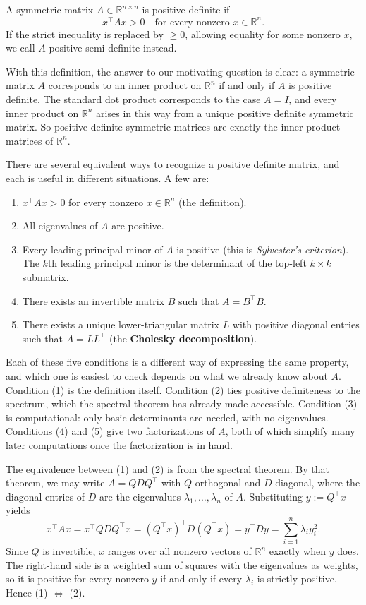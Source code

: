 \documentclass{article}
\begin{document}
\noindent A symmetric matrix $A \in \mathbb{R}^{n \times n}$ is positive definite if
$$x^\top A x > 0 \quad \text{for every nonzero } x \in \mathbb{R}^n.$$
If the strict inequality is replaced by $\geq 0$, allowing equality for some nonzero $x$, we call $A$ positive semi-definite instead.
 
With this definition, the answer to our motivating question is clear: a symmetric matrix $A$ corresponds to an inner product on $\mathbb{R}^n$ if and only if $A$ is positive definite. The standard dot product corresponds to the case $A = I$, and every inner product on $\mathbb{R}^n$ arises in this way from a unique positive definite symmetric matrix. So positive definite symmetric matrices are exactly the inner-product matrices of $\mathbb{R}^n$.
 
There are several equivalent ways to recognize a positive definite matrix, and each is useful in different situations. A few are:
\begin{enumerate}
    \item $x^\top A x > 0$ for every nonzero $x \in \mathbb{R}^n$ (the definition).
    \item All eigenvalues of $A$ are positive.
    \item Every leading principal minor of $A$ is positive (this is \textit{Sylvester's criterion}). The $k$th leading principal minor is the determinant of the top-left $k \times k$ submatrix.
    \item There exists an invertible matrix $B$ such that $A = B^\top B$.
    \item There exists a unique lower-triangular matrix $L$ with positive diagonal entries such that $A = L L^\top$ (the \textbf{Cholesky decomposition}).
\end{enumerate}
 
Each of these five conditions is a different way of expressing the same property, and which one is easiest to check depends on what we already know about $A$. Condition (1) is the definition itself. Condition (2) ties positive definiteness to the spectrum, which the spectral theorem has already made accessible. Condition (3) is computational: only basic determinants are needed, with no eigenvalues. Conditions (4) and (5) give two factorizations of $A$, both of which simplify many later computations once the factorization is in hand.
 
The equivalence between (1) and (2) is from the spectral theorem. By that theorem, we may write $A = QDQ^\top$ with $Q$ orthogonal and $D$ diagonal, where the diagonal entries of $D$ are the eigenvalues $\lambda_1, \dots, \lambda_n$ of $A$. Substituting $y := Q^\top x$ yields
$$x^\top A x = x^\top Q D Q^\top x = (Q^\top x)^\top D (Q^\top x) = y^\top D y = \sum_{i=1}^n \lambda_i y_i^2.$$
Since $Q$ is invertible, $x$ ranges over all nonzero vectors of $\mathbb{R}^n$ exactly when $y$ does. The right-hand side is a weighted sum of squares with the eigenvalues as weights, so it is positive for every nonzero $y$ if and only if every $\lambda_i$ is strictly positive. Hence (1) $\iff$ (2).
 
\end{document}
